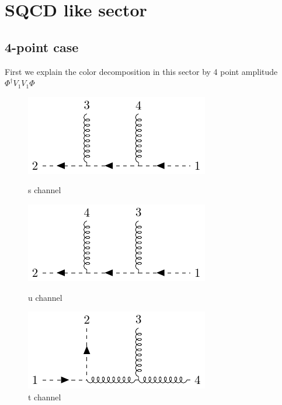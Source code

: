 \documentclass[12pt]{article}
\begin{document}
\section{SQCD like sector}
\subsection{4-point case}
First we explain the color decomposition in this sector by 4 point amplitude $\Phi^\dagger V_1V_1\Phi$
    \begin{figure}[htbp]
        \centering
        \begin{minipage}[t]{0.32\textwidth}
            \centering
            \includegraphics[width=\linewidth]{sch.pdf}
            \caption*{s channel}
        \end{minipage}
        \hfill
        \begin{minipage}[t]{0.32\textwidth}
            \centering
            \includegraphics[width=\linewidth]{uch.pdf}
            \caption*{u channel}
        \end{minipage}
        \hfill
        \begin{minipage}[t]{0.32\textwidth}
            \centering
            \includegraphics[width=\linewidth]{tch.pdf}
            \caption*{t channel}
        \end{minipage}
    \end{figure}
\end{document}
